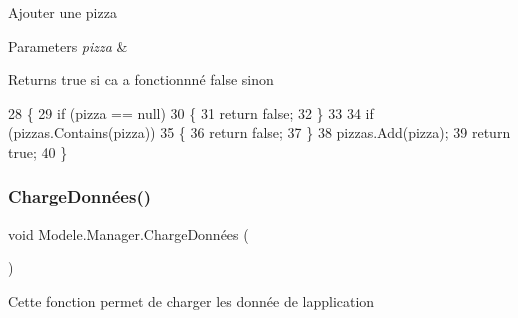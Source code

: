 Ajouter une pizza 


\begin{DoxyParams}{Parameters}
{\em pizza} & \\
\hline
\end{DoxyParams}
\begin{DoxyReturn}{Returns}
true si ca a fonctionnné false sinon
\end{DoxyReturn}

\begin{DoxyCode}
28         \{
29             \textcolor{keywordflow}{if} (pizza == null)
30             \{
31                 \textcolor{keywordflow}{return} \textcolor{keyword}{false};
32             \}
33 
34             \textcolor{keywordflow}{if} (pizzas.Contains(pizza))
35             \{
36                 \textcolor{keywordflow}{return} \textcolor{keyword}{false};
37             \}
38             pizzas.Add(pizza);
39             \textcolor{keywordflow}{return} \textcolor{keyword}{true};
40         \}
\end{DoxyCode}
\mbox{\label{classModele_1_1Manager_af864593f2ec5d93e298e54c838316bd6}} 
\subsubsection{\texorpdfstring{Charge\+Données()}{ChargeDonnées()}}
{\footnotesize\ttfamily void Modele.\+Manager.\+Charge\+Données (\begin{DoxyParamCaption}{ }\end{DoxyParamCaption})\hspace{0.3cm}{\ttfamily [inline]}}



Cette fonction permet de charger les donnée de l\textquotesingle{}application 


